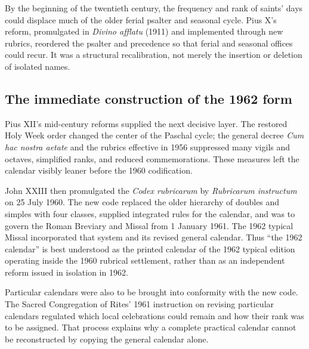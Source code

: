 By the beginning of the twentieth century, the frequency and rank of saints' days could displace much of the older ferial psalter and seasonal cycle. Pius X's reform, promulgated in \emph{Divino afflatu} (1911) and implemented through new rubrics, reordered the psalter and precedence so that ferial and seasonal offices could recur. It was a structural recalibration, not merely the insertion or deletion of isolated names.

\subsection{The immediate construction of the 1962 form}

Pius XII's mid-century reforms supplied the next decisive layer. The restored Holy Week order changed the center of the Paschal cycle; the general decree \emph{Cum hac nostra aetate} and the rubrics effective in 1956 suppressed many vigils and octaves, simplified ranks, and reduced commemorations. These measures left the calendar visibly leaner before the 1960 codification.

John XXIII then promulgated the \emph{Codex rubricarum} by \emph{Rubricarum instructum} on 25 July 1960. The new code replaced the older hierarchy of doubles and simples with four classes, supplied integrated rules for the calendar, and was to govern the Roman Breviary and Missal from 1 January 1961. The 1962 typical Missal incorporated that system and its revised general calendar. Thus ``the 1962 calendar'' is best understood as the printed calendar of the 1962 typical edition operating inside the 1960 rubrical settlement, rather than as an independent reform issued in isolation in 1962.

Particular calendars were also to be brought into conformity with the new code. The Sacred Congregation of Rites' 1961 instruction on revising particular calendars regulated which local celebrations could remain and how their rank was to be assigned. That process explains why a complete practical calendar cannot be reconstructed by copying the general calendar alone.
